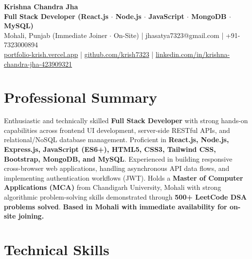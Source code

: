 \documentclass[a4paper,10pt]{article}
\begin{document}
\begin{center}

    {\LARGE \textbf{Krishna Chandra Jha}} \\[2.5pt]

    \textbf{Full Stack Developer (React.js $\cdot$ Node.js $\cdot$ JavaScript $\cdot$ MongoDB $\cdot$ MySQL)} \\[3.5pt]

    Mohali, Punjab (Immediate Joiner $\cdot$ On-Site)
    \quad | \quad
    jhasatya7323@gmail.com
    \quad | \quad
    +91-7323000894
    \\[2.5pt]

    \href{https://portfolio-ashen-alpha-dv0whhsamo.vercel.app/}{portfolio-krish.vercel.app}
    \quad | \quad
    \href{https://github.com/krish7323}{github.com/krish7323}
    \quad | \quad
    \href{https://linkedin.com/in/krishna-chandra-jha-423909321}
    {linkedin.com/in/krishna-chandra-jha-423909321}

\end{center}

\section*{Professional Summary}

Enthusiastic and technically skilled \textbf{Full Stack Developer} with strong hands-on capabilities across frontend UI development, server-side RESTful APIs, and relational/NoSQL database management. Proficient in \textbf{React.js, Node.js, Express.js, JavaScript (ES6+), HTML5, CSS3, Tailwind CSS, Bootstrap, MongoDB, and MySQL}. Experienced in building responsive cross-browser web applications, handling asynchronous API data flows, and implementing authentication workflows (JWT). Holds a \textbf{Master of Computer Applications (MCA)} from Chandigarh University, Mohali with strong algorithmic problem-solving skills demonstrated through \textbf{500+ LeetCode DSA problems solved}. \textbf{Based in Mohali with immediate availability for on-site joining.}

\section*{Technical Skills}
\end{document}

